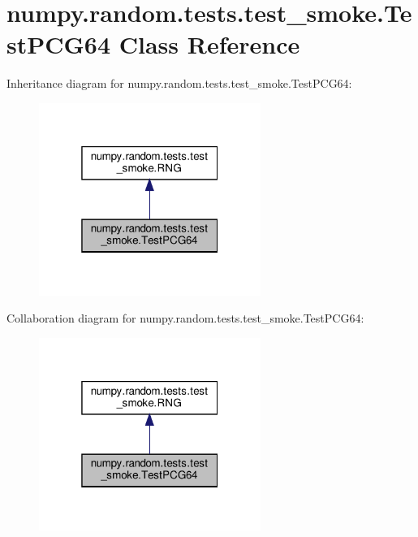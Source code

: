 \hypertarget{classnumpy_1_1random_1_1tests_1_1test__smoke_1_1TestPCG64}{}\section{numpy.\+random.\+tests.\+test\+\_\+smoke.\+Test\+P\+C\+G64 Class Reference}
\label{classnumpy_1_1random_1_1tests_1_1test__smoke_1_1TestPCG64}


Inheritance diagram for numpy.\+random.\+tests.\+test\+\_\+smoke.\+Test\+P\+C\+G64\+:
\nopagebreak
\begin{figure}[H]
\begin{center}
\leavevmode
\includegraphics[width=205pt]{classnumpy_1_1random_1_1tests_1_1test__smoke_1_1TestPCG64__inherit__graph}
\end{center}
\end{figure}


Collaboration diagram for numpy.\+random.\+tests.\+test\+\_\+smoke.\+Test\+P\+C\+G64\+:
\nopagebreak
\begin{figure}[H]
\begin{center}
\leavevmode
\includegraphics[width=205pt]{classnumpy_1_1random_1_1tests_1_1test__smoke_1_1TestPCG64__coll__graph}
\end{center}
\end{figure}
